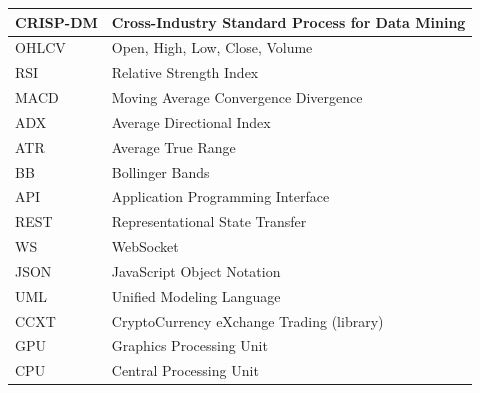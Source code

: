 \begin{longtable}{|l|>{\raggedright\arraybackslash}p{10cm}|}
\hline
CRISP-DM & Cross-Industry Standard Process for Data Mining \\
\hline
OHLCV & Open, High, Low, Close, Volume \\
\hline
RSI & Relative Strength Index \\
\hline
MACD & Moving Average Convergence Divergence \\
\hline
ADX & Average Directional Index \\
\hline
ATR & Average True Range \\
\hline
BB & Bollinger Bands \\
\hline
API & Application Programming Interface \\
\hline
REST & Representational State Transfer \\
\hline
WS & WebSocket \\
\hline
JSON & JavaScript Object Notation \\
\hline
UML & Unified Modeling Language \\
\hline
CCXT & CryptoCurrency eXchange Trading (library) \\
\hline
GPU & Graphics Processing Unit \\
\hline
CPU & Central Processing Unit \\
\hline
\end{longtable}
